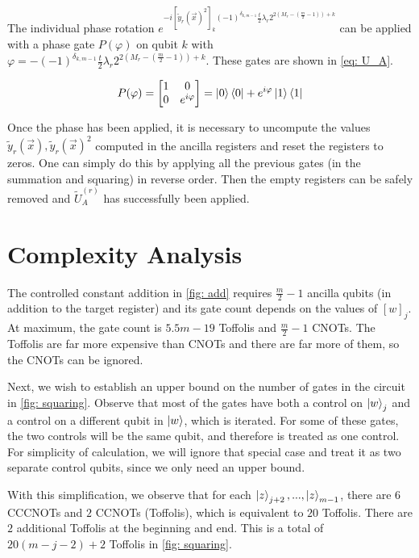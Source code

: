The individual phase rotation $e^{-i[\tilde{y}_r(\vec{x})^2]_k(-1)^{\delta_{k, m - 1}}\frac{t}{2}\lambda_r2^{2(M_r - (\frac{m}{2} - 1)) + k}}$ can be applied with a phase gate $P(\varphi)$ on qubit $k$ with $\varphi = -(-1)^{\delta_{k, m - 1}}\frac{t}{2}\lambda_r2^{2(M_r - (\frac{m}{2} - 1)) + k}$. These gates are shown in \eqref{eq: U_A}.

\begin{equation}
    P(\varphi) = \begin{bmatrix}
        1 & 0 \\ 0 & e^{i\varphi}
    \end{bmatrix} = \ket{0}\bra{0} + e^{i\varphi}\ket{1}\bra{1}
\end{equation}

Once the phase has been applied, it is necessary to uncompute the values $\tilde{y}_r(\vec{x}), \tilde{y}_r(\vec{x})^2$ computed in the ancilla registers and reset the registers to zeros. One can simply do this by applying all the previous gates (in the summation and squaring) in reverse order. Then the empty registers can be safely removed and $\tilde{U}_A^{(r)}$ has successfully been applied.

\section{Complexity Analysis}

The controlled constant addition in \ref{fig: add} requires $\frac{m}{2} - 1$ ancilla qubits (in addition to the target register) and its gate count depends on the values of $[w]_j$. At maximum, the gate count is $5.5m - 19$ Toffolis and $\frac{m}{2} - 1$ CNOTs. The Toffolis are far more expensive than CNOTs and there are far more of them, so the CNOTs can be ignored.

Next, we wish to establish an upper bound on the number of gates in the circuit in \ref{fig: squaring}. Observe that most of the gates have both a control on $\ket{w}_j$ and a control on a different qubit in $\ket{w}$, which is iterated. For some of these gates, the two controls will be the same qubit, and therefore is treated as one control. For simplicity of calculation, we will ignore that special case and treat it as two separate control qubits, since we only need an upper bound.

With this simplification, we observe that for each $\ket{z}_{j + 2}, ..., \ket{z}_{m - 1}$, there are $6$ CCCNOTs and $2$ CCNOTs (Toffolis), which is equivalent to $20$ Toffolis. There are $2$ additional Toffolis at the beginning and end. This is a total of $20(m - j - 2) + 2$ Toffolis in \ref{fig: squaring}.

